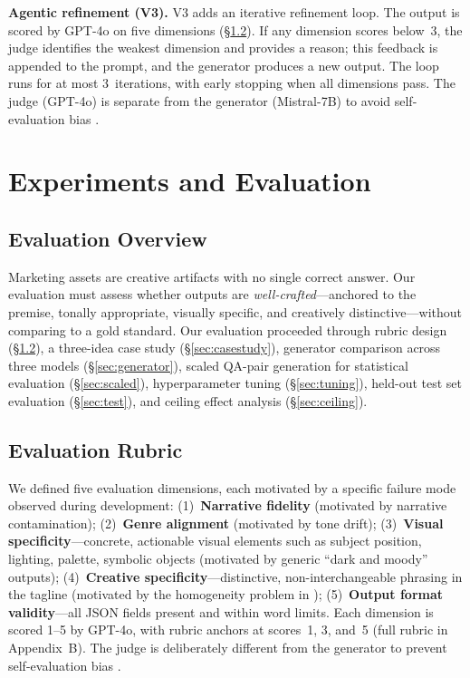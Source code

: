 \documentclass[10pt,twocolumn]{article}
\begin{document}
\textbf{Agentic refinement (V3).} V3 adds an iterative refinement loop. The output is scored by GPT-4o on five dimensions (\S\ref{sec:rubric}). If any dimension scores below~3, the judge identifies the weakest dimension and provides a reason; this feedback is appended to the prompt, and the generator produces a new output. The loop runs for at most 3~iterations, with early stopping when all dimensions pass. The judge (GPT-4o) is separate from the generator (Mistral-7B) to avoid self-evaluation bias \citep{zheng2023judging}.

\section{Experiments and Evaluation}

\subsection{Evaluation Overview}

Marketing assets are creative artifacts with no single correct answer. Our evaluation must assess whether outputs are \textit{well-crafted}---anchored to the premise, tonally appropriate, visually specific, and creatively distinctive---without comparing to a gold standard. Our evaluation proceeded through rubric design (\S\ref{sec:rubric}), a three-idea case study (\S\ref{sec:casestudy}), generator comparison across three models (\S\ref{sec:generator}), scaled QA-pair generation for statistical evaluation (\S\ref{sec:scaled}), hyperparameter tuning (\S\ref{sec:tuning}), held-out test set evaluation (\S\ref{sec:test}), and ceiling effect analysis (\S\ref{sec:ceiling}).

\subsection{Evaluation Rubric}
\label{sec:rubric}
We defined five evaluation dimensions, each motivated by a specific failure mode observed during development: (1)~\textbf{Narrative fidelity} (motivated by narrative contamination); (2)~\textbf{Genre alignment} (motivated by tone drift); (3)~\textbf{Visual specificity}---concrete, actionable visual elements such as subject position, lighting, palette, symbolic objects (motivated by generic ``dark and moody'' outputs); (4)~\textbf{Creative specificity}---distinctive, non-interchangeable phrasing in the tagline (motivated by the homogeneity problem in \citealp{sun2025ai}); (5)~\textbf{Output format validity}---all JSON fields present and within word limits. Each dimension is scored 1--5 by GPT-4o, with rubric anchors at scores~1, 3, and~5 (full rubric in Appendix~B). The judge is deliberately different from the generator to prevent self-evaluation bias \citep{zheng2023judging}.
\end{document}
